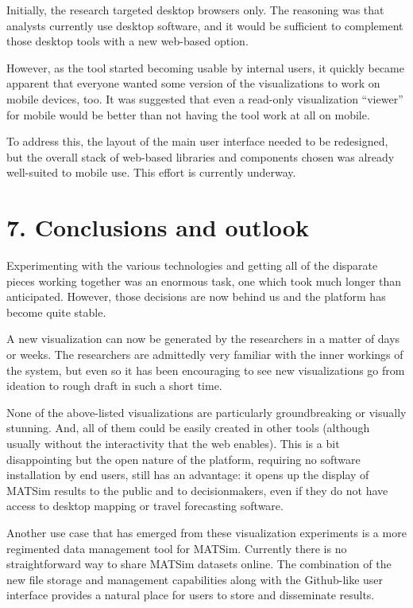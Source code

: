 Initially, the research targeted desktop browsers only. The reasoning was that analysts currently use desktop software, and it would be sufficient to complement those desktop tools with a new web-based option.

However, as the tool started becoming usable by internal users, it quickly became apparent that everyone wanted some version of the visualizations to work on mobile devices, too. It was suggested that even a read-only visualization ``viewer'' for mobile would be better than not having the tool work at all on mobile.

To address this, the layout of the main user interface needed to be redesigned, but the overall stack of web-based libraries and components chosen was already well-suited to mobile use. This effort is currently underway.

\hypertarget{conclusions-and-outlook}{%
\section{7. Conclusions and outlook}\label{conclusions-and-outlook}}

Experimenting with the various technologies and getting all of the disparate pieces working together was an enormous task, one which took much longer than anticipated. However, those decisions are now behind us and the platform has become quite stable.

A new visualization can now be generated by the researchers in a matter of days or weeks. The researchers are admittedly very familiar with the inner workings of the system, but even so it has been encouraging to see new visualizations go from ideation to rough draft in such a short time.

None of the above-listed visualizations are particularly groundbreaking or visually stunning. And, all of them could be easily created in other tools (although usually without the interactivity that the web enables). This is a bit disappointing but the open nature of the platform, requiring no software installation by end users, still has an advantage: it opens up the display of MATSim results to the public and to decisionmakers, even if they do not have access to desktop mapping or travel forecasting software.

Another use case that has emerged from these visualization experiments is a more regimented data management tool for MATSim. Currently there is no straightforward way to share MATSim datasets online. The combination of the new file storage and management capabilities along with the Github-like user interface provides a natural place for users to store and disseminate results.

